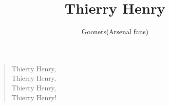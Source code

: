 \documentclass[a4paper,12pt]{article}
\title{Thierry Henry}
\author{Gooners(Arsenal fans)}
\date{}
\begin{document}
	
	\maketitle
	
	\begin{verse}
		
		Thierry Henry, \\
		Thierry Henry, \\
		Thierry Henry, \\
		Thierry Henry!
		
	\end{verse}
	
\end{document}
